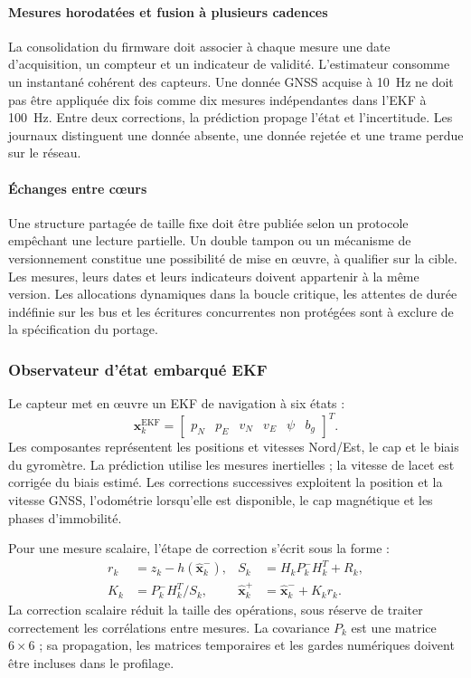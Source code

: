\paragraph{Mesures horodatées et fusion à plusieurs cadences}
La consolidation du firmware doit associer à chaque mesure une date d'acquisition, un compteur et un indicateur de validité. L'estimateur consomme un instantané cohérent des capteurs. Une donnée GNSS acquise à 10~Hz ne doit pas être appliquée dix fois comme dix mesures indépendantes dans l'EKF à 100~Hz. Entre deux corrections, la prédiction propage l'état et l'incertitude. Les journaux distinguent une donnée absente, une donnée rejetée et une trame perdue sur le réseau.

\paragraph{Échanges entre cœurs}
Une structure partagée de taille fixe doit être publiée selon un protocole empêchant une lecture partielle. Un double tampon ou un mécanisme de versionnement constitue une possibilité de mise en œuvre, à qualifier sur la cible. Les mesures, leurs dates et leurs indicateurs doivent appartenir à la même version. Les allocations dynamiques dans la boucle critique, les attentes de durée indéfinie sur les bus et les écritures concurrentes non protégées sont à exclure de la spécification du portage.
\FloatBarrier

\subsubsection{Observateur d'état embarqué EKF}

Le capteur met en œuvre un EKF de navigation à six états :
\begin{equation}
\boldsymbol{x}^{\mathrm{EKF}}_k=
\begin{bmatrix}p_N&p_E&v_N&v_E&\psi&b_g\end{bmatrix}^{\!T}.
\end{equation}
Les composantes représentent les positions et vitesses Nord/Est, le cap et le biais du gyromètre. La prédiction utilise les mesures inertielles ; la vitesse de lacet est corrigée du biais estimé. Les corrections successives exploitent la position et la vitesse GNSS, l'odométrie lorsqu'elle est disponible, le cap magnétique et les phases d'immobilité.

Pour une mesure scalaire, l'étape de correction s'écrit sous la forme :
\begin{align}
r_k &= z_k-h(\widehat{\boldsymbol{x}}^-_k),&
S_k &= H_kP^-_kH_k^T+R_k,\\
K_k &= P^-_kH_k^T/S_k,&
\widehat{\boldsymbol{x}}^+_k &= \widehat{\boldsymbol{x}}^-_k+K_kr_k.
\end{align}
La correction scalaire réduit la taille des opérations, sous réserve de traiter correctement les corrélations entre mesures. La covariance $P_k$ est une matrice $6\times6$ ; sa propagation, les matrices temporaires et les gardes numériques doivent être incluses dans le profilage.

